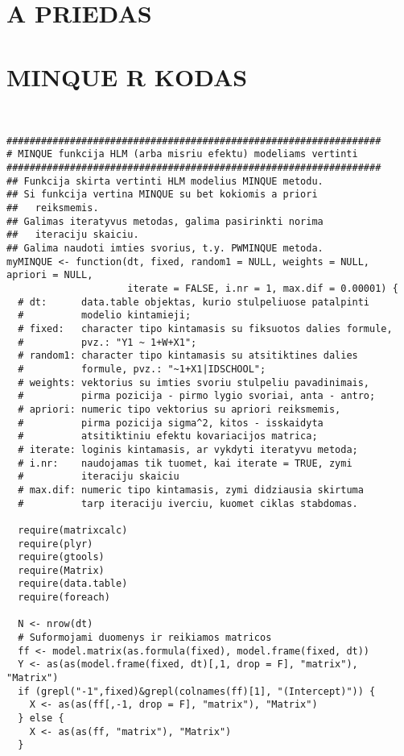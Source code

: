 \documentclass[12pt,a4paper]{article}
\begin{document}
\newpage
\begin{appendix}

 \hypertarget{appendixa}{\section*{A PRIEDAS}}
\section*{MINQUE R KODAS}

\begin{footnotesize}
\begin{verbatim}


#################################################################
# MINQUE funkcija HLM (arba misriu efektu) modeliams vertinti
#################################################################
## Funkcija skirta vertinti HLM modelius MINQUE metodu. 
## Si funkcija vertina MINQUE su bet kokiomis a priori 
##   reiksmemis.
## Galimas iteratyvus metodas, galima pasirinkti norima 
##   iteraciju skaiciu.
## Galima naudoti imties svorius, t.y. PWMINQUE metoda.
myMINQUE <- function(dt, fixed, random1 = NULL, weights = NULL, apriori = NULL,
                     iterate = FALSE, i.nr = 1, max.dif = 0.00001) {
  # dt:      data.table objektas, kurio stulpeliuose patalpinti 
  #          modelio kintamieji;
  # fixed:   character tipo kintamasis su fiksuotos dalies formule,
  #          pvz.: "Y1 ~ 1+W+X1";
  # random1: character tipo kintamasis su atsitiktines dalies
  #          formule, pvz.: "~1+X1|IDSCHOOL";
  # weights: vektorius su imties svoriu stulpeliu pavadinimais,
  #          pirma pozicija - pirmo lygio svoriai, anta - antro;
  # apriori: numeric tipo vektorius su apriori reiksmemis,
  #          pirma pozicija sigma^2, kitos - isskaidyta 
  #          atsitiktiniu efektu kovariacijos matrica;
  # iterate: loginis kintamasis, ar vykdyti iteratyvu metoda;
  # i.nr:    naudojamas tik tuomet, kai iterate = TRUE, zymi
  #          iteraciju skaiciu
  # max.dif: numeric tipo kintamasis, zymi didziausia skirtuma
  #          tarp iteraciju iverciu, kuomet ciklas stabdomas.
  
  require(matrixcalc)
  require(plyr)
  require(gtools)
  require(Matrix)
  require(data.table)
  require(foreach)
  
  N <- nrow(dt)
  # Suformojami duomenys ir reikiamos matricos
  ff <- model.matrix(as.formula(fixed), model.frame(fixed, dt))
  Y <- as(as(model.frame(fixed, dt)[,1, drop = F], "matrix"), "Matrix")
  if (grepl("-1",fixed)&grepl(colnames(ff)[1], "(Intercept)")) {
    X <- as(as(ff[,-1, drop = F], "matrix"), "Matrix")
  } else {
    X <- as(as(ff, "matrix"), "Matrix")
  }
  

\end{verbatim}
\end{footnotesize}
\end{appendix}
\end{document}
